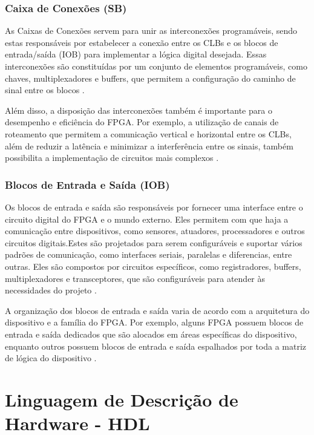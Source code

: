 \subsubsection{Caixa de Conexões (SB)}

As Caixas de Conexões servem para unir as interconexões programáveis, sendo estas responsáveis por estabelecer a conexão entre os CLBs e os blocos de entrada/saída (IOB) para implementar a lógica digital desejada. Essas interconexões são constituídas por um conjunto de elementos programáveis, como chaves, multiplexadores e buffers, que permitem a configuração do caminho de sinal entre os blocos
\cite{brown1992field}.

Além disso, a disposição das interconexões também é importante para o desempenho e eficiência do FPGA. Por exemplo, a utilização de canais de roteamento que permitem a
comunicação vertical e horizontal entre os CLBs, além de reduzir a latência e minimizar a interferência entre os sinais, também possibilita a implementação de circuitos mais complexos \cite{wong2007introduction}.

\subsubsection{Blocos de Entrada e Saída (IOB)}

Os blocos de entrada e saída são responsáveis por fornecer uma interface entre o circuito digital do FPGA e o mundo externo. Eles permitem com que haja a comunicação entre dispositivos, como sensores, atuadores, processadores e outros circuitos digitais.Estes são projetados para serem configuráveis e suportar vários padrões de comunicação, como interfaces seriais, paralelas e diferencias, entre outras. Eles são compostos por circuitos específicos, como registradores, buffers, multiplexadores e transceptores, que são configuráveis para atender às necessidades do projeto \cite{brown2013field, maxfield2004design}.

A organização dos blocos de entrada e saída varia de acordo com a arquitetura do dispositivo e a família do FPGA. Por exemplo, alguns FPGA possuem blocos de entrada e saída dedicados que são alocados em áreas específicas do dispositivo, enquanto outros possuem blocos de entrada e saída espalhados por toda a matriz de lógica do dispositivo \cite{xilinx2021ultrascale}.

\section{Linguagem de Descrição de Hardware - HDL}

